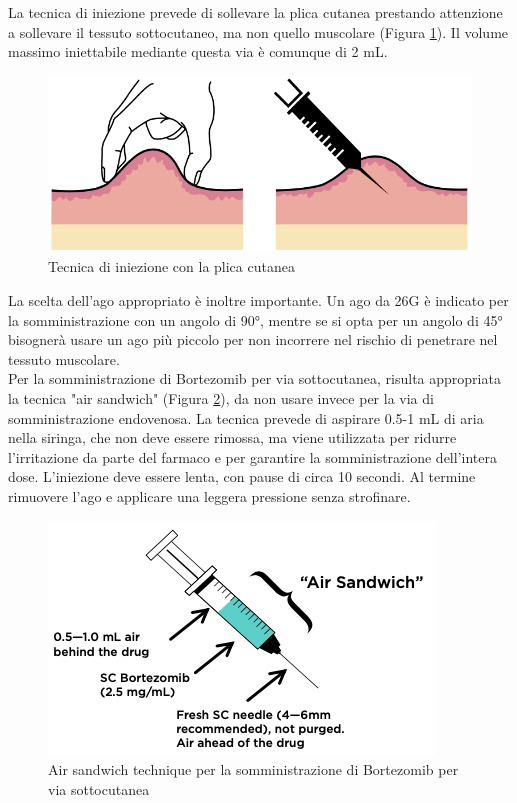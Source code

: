 La tecnica di iniezione prevede di sollevare la plica cutanea prestando attenzione a sollevare il tessuto 
sottocutaneo, ma non quello muscolare (Figura \ref{fig:FIGURE_3.6}). 
Il volume massimo iniettabile mediante questa via è comunque di 2 mL.

\begin{figure}[H]
    \begin{center}
    \includegraphics[width=0.5\columnwidth]{img/PLICA.png}
    \vspace{-3mm}
    \end{center}
    \caption{ Tecnica di iniezione con la plica cutanea
    \cite{BORTEZOMIB}}
    \label{fig:FIGURE_3.6}
\end{figure}

La scelta dell’ago appropriato è inoltre importante. Un ago da 26G è indicato per la somministrazione con un angolo di
90°, mentre se si opta per un angolo di 45° bisognerà usare un ago più piccolo per non incorrere nel rischio di 
penetrare nel tessuto muscolare\cite{BORTNURSES}.\\
Per la somministrazione di Bortezomib per via sottocutanea, risulta appropriata la tecnica "air sandwich" 
(Figura \ref{fig:FIGURE_3.7}),
da non usare invece per la via di somministrazione endovenosa. La tecnica prevede di aspirare 0.5-1 mL 
di aria nella siringa, che non deve essere rimossa, ma viene utilizzata per ridurre l'irritazione da parte del farmaco e 
per garantire la somministrazione dell'intera dose. L'iniezione deve essere lenta, con pause di circa 10 secondi. 
Al termine rimuovere l'ago e applicare una leggera pressione senza strofinare\cite{BORTNURSES}.

\begin{figure}[H]
    \begin{center}
    \includegraphics[width=0.5\columnwidth]{img/SIRINGA.png}
    \vspace{-3mm}
    \end{center}
    \caption{ Air sandwich technique per la somministrazione di Bortezomib per via sottocutanea
    \cite{BORTEZOMIB}}
    \label{fig:FIGURE_3.7}
\end{figure}

